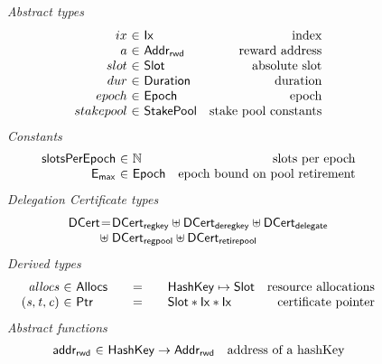 \begin{figure}
  \emph{Abstract types}
  \begin{equation*}
    \begin{array}{r@{~\in~}lr}
      ix & \Ix & \text{index}\\
      a & \AddrRWD & \text{reward address} \\
      slot & \Slot & \text{absolute slot}\\
      dur & \Duration & \text{duration}\\
      epoch & \Epoch & \text{epoch} \\
      stakepool & \StakePool & \text{stake pool constants}
    \end{array}
  \end{equation*}
  \emph{Constants}
  \begin{equation*}
    \begin{array}{r@{~\in~}lr}
      \slotsPer & \mathbb{N} & \text{slots per epoch} \\
      \emax & \Epoch & \text{epoch bound on pool retirement} \\
    \end{array}
  \end{equation*}
  \emph{Delegation Certificate types}
  \begin{equation*}
  \begin{array}{r@{}c@{}l}
    \DCert &=& \DCertRegKey \uniondistinct \DCertDeRegKey \uniondistinct \DCertDeleg \\
                &\hfill\uniondistinct\;& \DCertRegPool \uniondistinct \DCertRetirePool
  \end{array}
  \end{equation*}
  \emph{Derived types}
  \begin{equation*}
    \begin{array}{r@{~\in~}l@{\qquad=\qquad}lr}
      \var{allocs}
      & \Allocs
      & \HashKey \mapsto \Slot
      & \text{resource allocations} \\
      \var{(s,t,c)}
      & \Ptr
      & \Slot*\Ix*\Ix
      & \text{certificate pointer}
    \end{array}
  \end{equation*}
  \emph{Abstract functions}
  \begin{equation*}
  \begin{array}{r@{~\in~}lr}
  \fun{addr_{rwd}} & \HashKey \to \AddrRWD
  & \text{address of a hashKey}
  \\

\end{array}
\end{equation*}
\end{figure}
